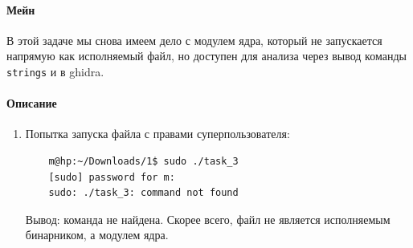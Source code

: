     \paragraph{Мейн}
    В этой задаче мы снова имеем дело с модулем ядра, который не запускается напрямую как исполняемый файл, но доступен для анализа через вывод команды \texttt{strings} и в ghidra.

    \paragraph{Описание}
    \begin{enumerate}
        \item Попытка запуска файла с правами суперпользователя:
        \begin{verbatim}
    m@hp:~/Downloads/1$ sudo ./task_3
    [sudo] password for m:
    sudo: ./task_3: command not found
        \end{verbatim}
        Вывод: команда не найдена. Скорее всего, файл не является исполняемым бинарником, а модулем ядра.


\end{enumerate}
